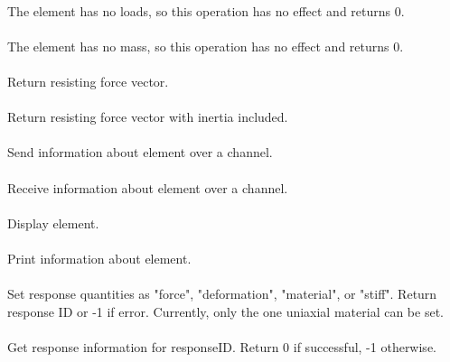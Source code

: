  \\
The element has no loads, so this operation has no effect and returns 0.
\\

 \\    
The element has no mass, so this operation has no effect and returns 0.
\\

 \\
Return resisting force vector.
\\

 \\            
Return resisting force vector with inertia included.
\\

 \\
Send information about element over a channel.
\\

 \\
Receive information about element over a channel.
\\

 \\    
Display element.
\\

 \\    
Print information about element.
\\

 \\
Set response quantities as "force", "deformation", "material", or "stiff".  Return response
ID  or -1 if error.  Currently, only the one uniaxial material can be set.
\\

 \\
Get response information for \p responseID.  Return 0 if successful, -1 otherwise.
\\






